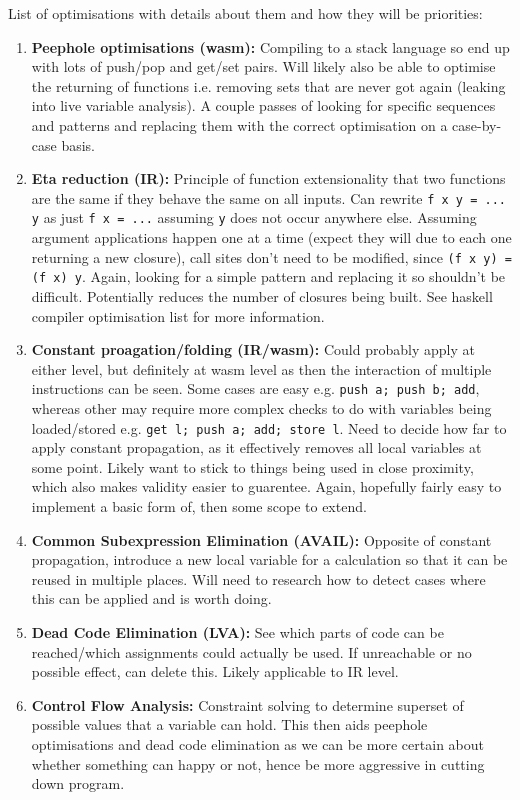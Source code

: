 \documentclass[10pt,twoside,a4paper]{article}
\begin{document}

List of optimisations with details about them and how they will be priorities:

\begin{enumerate}
\item \textbf{Peephole optimisations (wasm): } Compiling to a stack language so end up with lots of push/pop and get/set pairs. Will likely also  be able to optimise the returning of functions i.e. removing sets that are never got again (leaking into live variable analysis). A couple passes of looking for specific sequences and patterns and replacing them with the correct optimisation on a case-by-case basis.

\item \textbf{Eta reduction (IR): } Principle of function extensionality that two functions are the same if they behave the same on all inputs. Can rewrite \verb|f x y = ... y| as just \verb|f x = ...| assuming \verb|y| does not occur anywhere else. Assuming argument applications happen one at a time (expect they will due to each one returning a new closure), call sites don't need to be modified, since \verb|(f x y) = (f x) y|. Again, looking for a simple pattern and replacing it so shouldn't be difficult. Potentially reduces the number of closures being built. See haskell compiler optimisation list for more information.

\item \textbf{Constant proagation/folding (IR/wasm): } Could probably apply at either level, but definitely at wasm level as then the interaction of multiple instructions can be seen. Some cases are easy e.g. \verb|push a; push b; add|, whereas other may require more complex checks to do with variables being loaded/stored e.g. \verb|get l; push a; add; store l|. Need to decide how far to apply constant propagation, as it effectively removes all local variables at some point. Likely want to stick to things being used in close proximity, which also makes validity easier to guarentee. Again, hopefully fairly easy to implement a basic form of, then some scope to extend. 

\item \textbf{Common Subexpression Elimination (AVAIL): } Opposite of constant propagation, introduce a new local variable for a calculation so that it can be reused in multiple places. Will need to research how to detect cases where this can be applied and is worth doing.

\item \textbf{Dead Code Elimination (LVA): }See which parts of code can be reached/which assignments could actually be used. If unreachable or no possible effect, can delete this. Likely applicable to IR level.

\item \textbf{Control Flow Analysis: } Constraint solving to determine superset of possible values that a variable can hold. This then aids peephole optimisations and dead code elimination as we can be more certain about whether something can happy or not, hence be more aggressive in cutting down program.

\end{enumerate}
\end{document}
